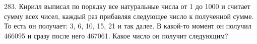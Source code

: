 283. Кирилл выписал по порядку все натуральные числа от 1 до 1000 и считает сумму всех чисел, каждый раз прибавляя следующее число к полученной сумме. То есть он получает: 3, 6, 10, 15, 21 и так далее. В какой-то момент он получил 466095 и сразу после него 467061. Какое число он получит следующим?\\
